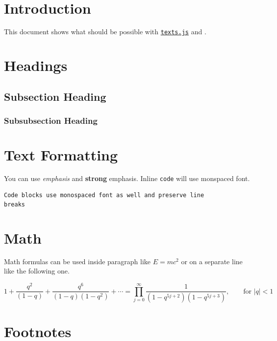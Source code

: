 \documentclass[10pt]{article}
\begin{document}
\section{Introduction}

This document shows what should be possible with
\href{http://textjs.org/}{\texttt{texts.js}} and
\href{http://en.wikipedia.org/wiki/XeTeX}{\XeTeX{}}.

\section{Headings}

\subsection{Subsection Heading}

\subsubsection{Subsubsection Heading}
\label{sec:somesection}

\section{Text Formatting}

You can use \emph{emphasis} and \textbf{strong} emphasis. Inline \texttt{code}
will use monspaced font.

\begin{verbatim}
Code blocks use monospaced font as well and preserve line
breaks
\end{verbatim}

\section{Math}

Math formulas can be used inside paragraph like $E=mc^2$ or on a separate line
like the following one.

\begin{equation}
\label{eq:myequation}
1+\frac{q^2}{(1-q)}+\frac{q^6}{(1-q)(1-q^2)}+\cdots =
\prod_{j=0}^{\infty}\frac{1}{(1-q^{5j+2})(1-q^{5j+3})},
\quad\quad \text{for $|q|<1$}
\end{equation}

\section{Footnotes}
\end{document}

